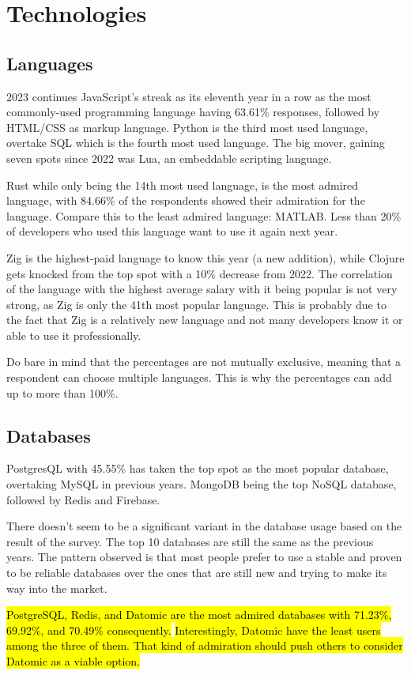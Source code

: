 \documentclass[12pt,titlepage]{article}
\begin{document}
\section{Technologies}
\subsection{Languages}
2023 continues JavaScript’s streak as its eleventh year in a row as the most commonly-used
programming language having 63.61\% responses, followed by HTML/CSS as markup language.
Python is the third most used language, overtake SQL which is the fourth most used language.
The big mover, gaining seven spots since 2022 was Lua, an embeddable scripting language.

Rust while only being the 14th most used language, is the most admired language, with 84.66\% of
the respondents showed their admiration for the language. Compare this to the least admired 
language: MATLAB. Less than 20\% of developers who used this language want to use it again next year.

Zig is the highest-paid language to know this year (a new addition), while Clojure gets knocked
from the top spot with a 10\% decrease from 2022. The correlation of the language with the highest
average salary with it being popular is not very strong, as Zig is only the 41th most popular language.
This is probably due to the fact that Zig is a relatively new language and not many developers know it
or able to use it professionally.

Do bare in mind that the percentages are not mutually exclusive, meaning that a respondent
can choose multiple languages. This is why the percentages can add up to more than 100\%.

\subsection{Databases}
PostgresQL with 45.55\% has taken the top spot as the most popular database, overtaking 
MySQL in previous years. MongoDB being the top NoSQL database, followed by Redis and Firebase.

There doesn't seem to be a significant variant in the database usage based on the result
of the survey. The top 10 databases are still the same as the previous years. The pattern
observed is that most people prefer to use a stable and proven to be reliable databases over
the ones that are still new and trying to make its way into the market.

\hl{PostgreSQL, Redis, and Datomic are the most admired databases with 71.23\%, 69.92\%, and 70.49\%
consequently.}  \hl{Interestingly, Datomic have the least users among the three of them.
That kind of admiration should push others to consider Datomic as a viable option.}
\end{document}
